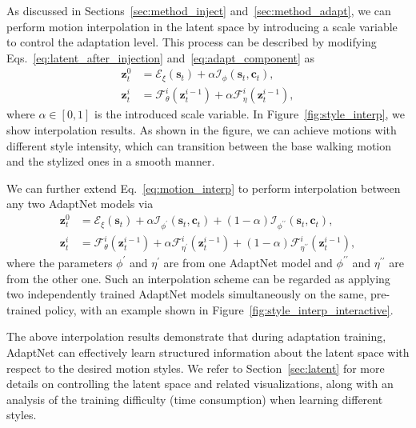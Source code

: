 As discussed in Sections~\ref{sec:method_inject} and~\ref{sec:method_adapt},
we can perform motion interpolation in the latent space by introducing a scale variable to control the adaptation level.
This process can be described by modifying Eqs.~\ref{eq:latent_after_injection} and~\ref{eq:adapt_component} as
\begin{equation}\label{eq:motion_interp}\begin{split}
     \mathbf{z}_t^{0} & = \mathcal{E}_\xi(\mathbf{s}_t) + \alpha \mathcal{I}_\phi(\mathbf{s}_t, \mathbf{c}_t), \\
     \mathbf{z}_t^i & = \mathcal{F}_{\theta}^i (\mathbf{z}_t^{i-1}) + \alpha \mathcal{F}_{\eta}^i(\mathbf{z}_t^{i-1}), 
\end{split}\end{equation}
where $\alpha \in [0, 1]$ is the introduced scale variable.
In Figure~\ref{fig:style_interp}, we show  interpolation results. 
As shown in the figure, 
we can achieve motions with different style intensity, which can transition between the base walking motion and the stylized ones in a smooth manner.

We can further extend Eq.~\ref{eq:motion_interp} to perform interpolation between any two AdaptNet models via%
\begin{equation}\begin{split}
     \mathbf{z}_t^{0} & = \mathcal{E}_\xi(\mathbf{s}_t) + \alpha \mathcal{I}_{\phi^\prime}(\mathbf{s}_t, \mathbf{c}_t) + (1-\alpha) \mathcal{I}_{\phi^{\prime\prime}}(\mathbf{s}_t, \mathbf{c}_t), \\
     \mathbf{z}_t^i & = \mathcal{F}_{\theta}^i (\mathbf{z}_t^{i-1}) + \alpha \mathcal{F}_{\eta^\prime}^i(\mathbf{z}_t^{i-1}) + (1-\alpha)\mathcal{F}_{\eta^{\prime\prime}}^i(\mathbf{z}_t^{i-1}),
\end{split}\end{equation}
where the parameters $\phi^\prime$ and $\eta^\prime$ are from one AdaptNet model and $\phi^{\prime\prime}$ and $\eta^{\prime\prime}$ are from the other one.
Such an interpolation scheme can be regarded as applying two independently trained AdaptNet models simultaneously on the same, pre-trained policy, with an example shown in 
Figure~\ref{fig:style_interp_interactive}.

The above interpolation results demonstrate 
that during adaptation training, AdaptNet can effectively learn structured information about the latent space with respect to the desired motion styles.
We refer to Section~\ref{sec:latent} for more details on controlling the latent space and related visualizations,  
along  
with an analysis of the training difficulty (time consumption) when learning different styles.

